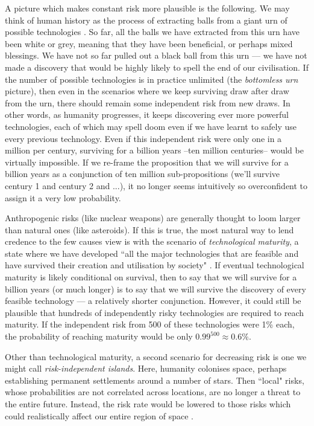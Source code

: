 \documentclass[british]{article}
\begin{document}
A picture which makes constant risk more plausible is the following. We may think of human history as the process of extracting balls from a giant urn of possible technologies \citep{bostrom_existential_2013}. So far, all the balls we have extracted from this urn have been white or grey, meaning that they have been beneficial, or perhaps mixed blessings. We have not so far pulled out a black ball from this urn --- we have not made a discovery that would be highly likely to spell the end of our civilisation. If the number of possible technologies is in practice unlimited (the \emph{bottomless urn} picture), then even in the scenarios where we keep surviving draw after draw from the urn, there should remain some independent risk from new draws. In other words, as humanity progresses, it keeps discovering ever more powerful technologies, each of which may spell doom even if we have learnt to safely use every previous technology. Even if this independent risk were only one in a million per century, surviving for a billion years --ten million centuries-- would be virtually impossible. If we re-frame the proposition that we will survive for a billion years as a conjunction of ten million sub-propositions (we'll survive century 1 and century 2 and ...), it no longer seems intuitively so overconfident to assign it a very low probability.

Anthropogenic risks (like nuclear weapons) are generally thought to loom larger than natural ones (like asteroids). If this is true, the most natural way to lend credence to the few causes view is with the scenario of \emph{technological maturity}, a state where we have developed ``all the major technologies that are feasible and have survived their creation and utilisation by society" \citep{ord_modelling_????}. If eventual technological maturity is likely conditional on survival, then to say that we will survive for a billion years (or much longer) is to say that we will survive the discovery of every feasible technology --- a relatively shorter conjunction. However, it could still be plausible that hundreds of independently risky technologies are required to reach maturity. If the independent risk from 500 of these technologies were 1\% each, the probability of reaching maturity would be only $0.99^{500}\approx0.6\%$.

Other than technological maturity, a second scenario for decreasing risk is one we might call \emph{risk-independent islands}. Here,
humanity colonises space, perhaps establishing permanent settlements
around a number of stars. Then ``local" risks, whose probabilities are
not correlated across locations, are no longer a threat to the entire
future. Instead, the risk rate would be lowered to
those risks which could realistically affect our entire region of
space \citep{ord_modelling_????}.
\end{document}
